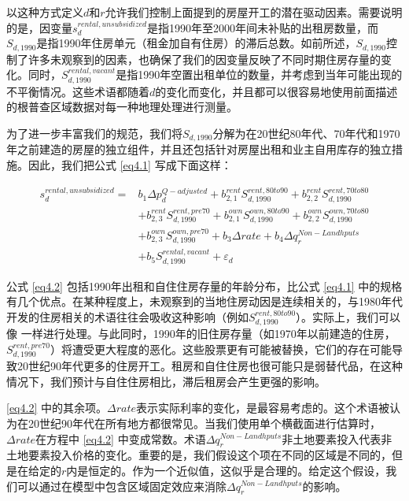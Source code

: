 \documentclass[lang=cn,11pt,a4paper]{paper}
\begin{document}
以这种方式定义$d$和$r$允许我们控制上面提到的房屋开工的潜在驱动因素。需要说明的是，因变量$s_{d}^{rental,unsubsidized}$是指1990年至2000年间未补贴的出租房数量，而$S_{d, 1990}$是指1990年住房单元（租金加自有住房）的滞后总数。如前所述，$S_{d, 1990}$控制了许多未观察到的因素，也确保了我们的因变量反映了不同时期住房存量的变化。同时，$S_{d, 1990}^{rental, vacant}$是指1990年空置出租单位的数量，并考虑到当年可能出现的不平衡情况。这些术语都随着$d$的变化而变化，并且都可以很容易地使用前面描述的根普查区域数据对每一种地理处理进行测量。

为了进一步丰富我们的规范，我们将$S_{d, 1990}$分解为在20世纪80年代、70年代和1970年之前建造的房屋的独立组件，并且还包括针对房屋出租和业主自用库存的独立措施。因此，我们把公式 \eqref{eq4.1} 写成下面这样：

\begin{equation}\label{eq4.2}
\begin{aligned}
  s_{d}^{rental,unsubsidized}=& b_{1} \Delta p_{d}^{Q-adjusted}+b_{2,1}^{rent} S_{d, 1990}^{rent, 80 t o 90}+b_{2,2}^{rent} S_{d, 1990}^{rent, 70 to 80} \\
  &+b_{2,3}^{rent} S_{d, 1990}^{rent, pre 70}+b_{2,1}^{own} S_{d, 1990}^{own, 80 to 90}+b_{2,2}^{own} S_{d, 1990}^{own, 70 to 80} \\
  &+b_{2,3}^{own} S_{d, 1990}^{own, pre 70}+b_{3} \Delta rate+b_{4} \Delta q_{r}^{Non-Landhputs} \\
  &+b_{5} S_{d, 1990}^{rental,vacant}+\varepsilon_{d}
  \end{aligned}
\end{equation}

公式 \eqref{eq4.2} 包括1990年出租和自住住房存量的年龄分布，比公式 \eqref{eq4.1} 中的规格有几个优点。在某种程度上，未观察到的当地住房动因是连续相关的，与1980年代开发的住房相关的术语往往会吸收这种影响（例如$S_{d, 1990}^{rent, 80 t o 90}$）。实际上，我们可以像 \cite{Mayer200085} 一样进行处理。与此同时，1990年的旧住房存量（如1970年以前建造的住房，$S_{d, 1990}^{rent, pre 70}$）将遭受更大程度的恶化。这些股票更有可能被替换，它们的存在可能导致20世纪90年代更多的住房开工。租房和自住住房也很可能只是弱替代品，在这种情况下，我们预计与自住住房相比，滞后租房会产生更强的影响。

\eqref{eq4.2} 中的其余项。$\Delta rate$表示实际利率的变化，是最容易考虑的。这个术语被认为在20世纪90年代在所有地方都很常见。当我们使用单个横截面进行估算时，$\Delta rate$在方程中 \eqref{eq4.2} 中变成常数。术语$\Delta q_{r}^{Non-Landhputs}$非土地要素投入代表非土地要素投入价格的变化。重要的是，我们假设这个项在不同的区域是不同的，但是在给定的$r$内是恒定的。作为一个近似值，这似乎是合理的。给定这个假设，我们可以通过在模型中包含区域固定效应来消除$\Delta q_{r}^{Non-Landhputs}$的影响。
\end{document}
